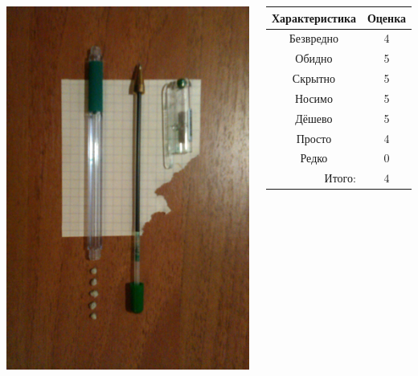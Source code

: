 \begin{frame}  %
    \begin{columns}
            \begin{center}
                \includegraphics[width=.8\textwidth]{fig/airpipe}
            \end{center}
            
            \begin{center}
                \begin{tabular}{c|c}
                    \hline\hline
                    Характеристика              & Оценка\\ \hline\hline
                    Безвредно                   & 4 \\
                    Обидно                      & 5 \\
                    Скрытно                     & 5 \\
                    Носимо                      & 5 \\
                    Дёшево                      & 5 \\
                    Просто                      & 4 \\ 
                    Редко                       & 0 \\ \hline
                    \multicolumn{1}{r|}{Итого:} & $4$ \\
                \end{tabular}
            \end{center}
    \end{columns}    
\end{frame}



